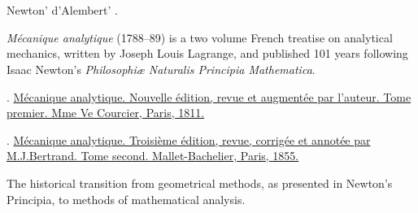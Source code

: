 \section{}

\label{section:virtualworkprinciple.classicalmechanics}

Newton’
d’Alembert’%
\ru{\:---}
.

\emph{Mécanique analytique} (1788--89) is a two volume French treatise on analytical mechanics, written by Joseph Louis Lagrange, and published 101 years following Isaac Newton’s \emph{Philosophiæ Naturalis Principia Mathematica}.

.
\href{https://play.google.com/books/reader?id=Q8MKAAAAYAAJ&pg=GBS.PP7}{Mécanique analytique. Nouvelle édition, revue et augmentée par l’auteur. Tome premier. Mme Ve Courcier, Paris, 1811.} 

.
\href{https://play.google.com/books/reader?id=TmMSAAAAIAAJ&pg=GBS.PP9}{Mécanique analytique. Troisième édition, revue, corrigée et annotée par M.\:J.\:Bertrand. Tome second. Mallet-Bachelier, Paris, 1855.} 

The historical transition from geometrical methods, as presented in Newton’s Principia, to methods of mathematical analysis.

